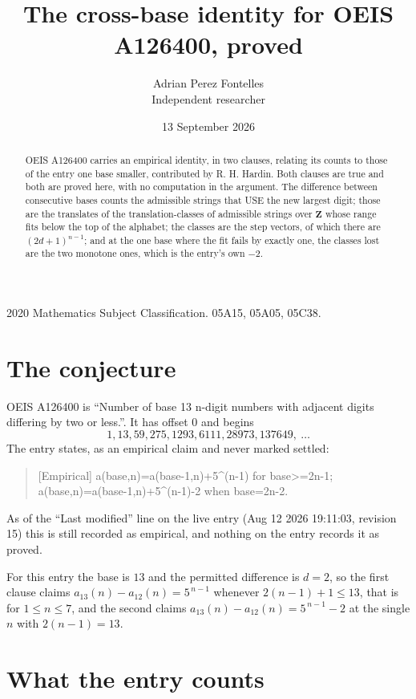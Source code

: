 \documentclass[11pt,a4paper]{article}
\title{The cross-base identity for OEIS A126400, proved}
\author{Adrian Perez Fontelles\\ \small Independent researcher}
\date{13 September 2026}
\theoremstyle{plain}
\theoremstyle{definition}
\begin{document}
\maketitle

\begin{abstract}
OEIS A126400 carries an empirical identity, in two clauses, relating its counts to those of the
entry one base smaller, contributed by R. H. Hardin. Both clauses are true and both are proved
here, with no computation in the argument. The difference between consecutive bases counts the
admissible strings that USE the new largest digit; those are the translates of the
translation-classes of admissible strings over $\mathbf{Z}$ whose range fits below the top of
the alphabet; the classes are the step vectors, of which there are $(2d+1)^{n-1}$; and at the
one base where the fit fails by exactly one, the classes lost are the two monotone ones, which
is the entry's own $-2$.
\end{abstract}

\noindent\small 2020 Mathematics Subject Classification. 05A15, 05A05, 05C38.\normalsize

\section{The conjecture}

OEIS A126400 is ``Number of base 13 n-digit numbers with adjacent digits differing by two or less.''. It has offset $0$ and begins
\[
1, 13, 59, 275, 1293, 6111, 28973, 137649,\ \dots
\]
The entry states, as an empirical claim and never marked settled:
\begin{quote}
[Empirical] a(base,n)=a(base-1,n)+5\textasciicircum{}(n-1) for base>=2n-1; a(base,n)=a(base-1,n)+5\textasciicircum{}(n-1)-2 when base=2n-2.
\end{quote}
As of the ``Last modified'' line on the live entry (Aug 12 2026 19:11:03, revision 15)
this is still recorded as empirical, and nothing on the entry records it as proved.

For this entry the base is $13$ and the permitted difference is $d=2$, so the first clause
claims $a_{13}(n)-a_{12}(n)=5^{\,n-1}$ whenever $2(n-1)+1\le13$, that is for
$1\le n\le7$, and the second claims $a_{13}(n)-a_{12}(n)=5^{\,n-1}-2$ at the single
$n$ with $2(n-1)=13$.

\section{What the entry counts}
\end{document}
